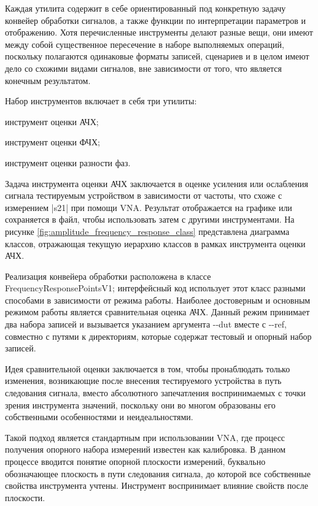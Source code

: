 \documentclass{report}
\begin{document}
Каждая утилита содержит в себе ориентированный под конкретную задачу конвейер обработки сигналов, а также функции по интерпретации параметров и отображению. Хотя перечисленные инструменты делают разные вещи, они имеют между собой существенное пересечение в наборе выполняемых операций, поскольку полагаются одинаковые форматы записей, сценариев и в целом имеют дело со схожими видами сигналов, вне зависимости от того, что является конечным результатом.

Набор инструментов включает в себя три утилиты:

\begin{enummarker}
    \item инструмент оценки АЧХ;
    \item инструмент оценки ФЧХ;
    \item инструмент оценки разности фаз.
\end{enummarker}

Задача инструмента оценки АЧХ заключается в оценке усиления или ослабления сигнала тестируемым устройством в зависимости от частоты, что схоже с измерением |s21| при помощи VNA. Результат отображается на графике или сохраняется в файл, чтобы использовать затем с другими инструментами. На рисунке \ref{fig:amplitude_frequency_response_class} представлена диаграмма классов, отражающая текущую иерархию классов в рамках инструмента оценки АЧХ.


Реализация конвейера обработки расположена в классе FrequencyResponsePointsV1; интерфейсный код использует этот класс разными способами в зависимости от режима работы.
Наиболее достоверным и основным режимом работы является сравнительная оценка АЧХ. Данный режим принимает два набора записей и вызывается указанием аргумента -{}-dut вместе с -{}-ref, совместно с путями к директориям, которые содержат тестовый и опорный набор записей.

Идея сравнительной оценки заключается в том, чтобы пронаблюдать только изменения, возникающие после внесения тестируемого устройства в путь следования сигнала, вместо абсолютного запечатления воспринимаемых с точки зрения инструмента значений, поскольку они во многом образованы его собственными особенностями и неидеальностями.

Такой подход является стандартным при использовании VNA, где процесс получения опорного набора измерений известен как калибровка. В данном процессе вводится понятие опорной плоскости измерений, буквально обозначающее плоскость в пути следования сигнала, до которой все собственные свойства инструмента учтены. Инструмент воспринимает влияние свойств после плоскости.
\end{document}
